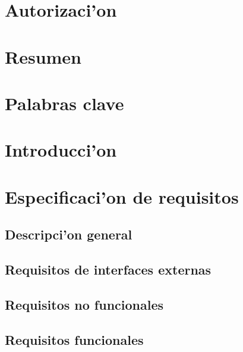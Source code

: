 \documentclass[a4paper]{article}
\begin{document}

\newpage  
\begin{large}


\newpage 

\section{Autorizaci'on}
	

\newpage

\section{Resumen}
	
	

\newpage 

\section{Palabras clave}
	


\newpage
\section{Introducci'on}
	

\newpage

\section{Especificaci'on de requisitos}

	\subsection{Descripci'on general}
		

	\subsection{Requisitos de interfaces externas}
		

	\subsection{Requisitos no funcionales}
		

	\subsection{Requisitos funcionales}
		


\end{large}
\end{document}
